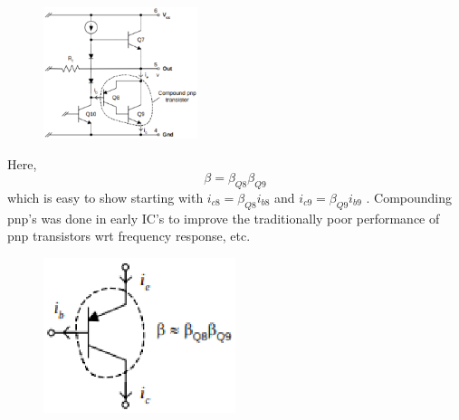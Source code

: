 \documentclass[journal,12pt,twocolumn]{IEEEtran}
\renewcommand\thesection{\arabic{section}}
\begin{document}
\begin{enumerate}[label=\thesection.\arabic*,ref=\thesection.\theenumi]
\begin{figure}[!ht]
    \includegraphics[width=0.4\textwidth]{./figs/LM3867.eps}

\caption{}
\label{fig:1}
\end{figure}
\solution
Here,
$$\beta = \beta_{Q8} \beta_{Q9}$$  which is easy to show starting with
$i_{c8}=\beta_{Q8}i_{b8}$ and $i_{c9}=\beta_{Q9}i_{b9}$ . Compounding pnp’s was done in
early IC’s to improve the traditionally poor performance of pnp
transistors wrt frequency response, etc. 


\begin{figure}[!ht]
  \centering
 
    \includegraphics[width=0.5\textwidth]{./figs/LM3868.eps}

\caption{}
\label{fig:1}
\end{figure}
\end{enumerate}
\end{document}
